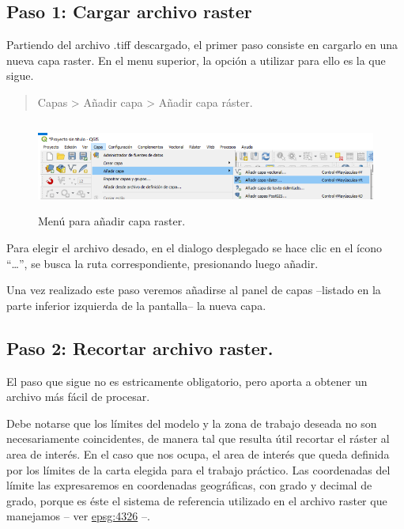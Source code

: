 \documentclass[12pt,]{extarticle}
\begin{document}
\hypertarget{paso-1-cargar-archivo-raster}{%
\subsection{Paso 1: Cargar archivo
raster}\label{paso-1-cargar-archivo-raster}}

Partiendo del archivo .tiff descargado, el primer paso consiste en
cargarlo en una nueva capa raster. En el menu superior, la opción a
utilizar para ello es la que sigue.

\begin{quote}
Capas \textgreater{} Añadir capa \textgreater{} Añadir capa ráster.
\end{quote}

\begin{figure}
\centering
\includegraphics[width=5.90556in,height=1.16875in]{../img/image1.png}
\caption{Menú para añadir capa raster.}
\end{figure}

Para elegir el archivo desado, en el dialogo desplegado se hace clic en
el ícono ``\ldots{}'', se busca la ruta correspondiente, presionando
luego añadir.

Una vez realizado este paso veremos añadirse al panel de capas --listado
en la parte inferior izquierda de la pantalla-- la nueva capa.

\hypertarget{paso-2-recortar-archivo-raster.}{%
\subsection{Paso 2: Recortar archivo
raster.}\label{paso-2-recortar-archivo-raster.}}

El paso que sigue no es estricamente obligatorio, pero aporta a obtener
un archivo más fácil de procesar.

Debe notarse que los límites del modelo y la zona de trabajo deseada no
son necesariamente coincidentes, de manera tal que resulta útil recortar
el ráster al area de interés. En el caso que nos ocupa, el area de
interés que queda definida por los límites de la carta elegida para el
trabajo práctico. Las coordenadas del límite las expresaremos en
coordenadas geográficas, con grado y decimal de grado, porque es éste el
sistema de referencia utilizado en el archivo raster que manejamos --
ver \href{https://epsg.io/4326}{epsg:4326} --.
\end{document}
